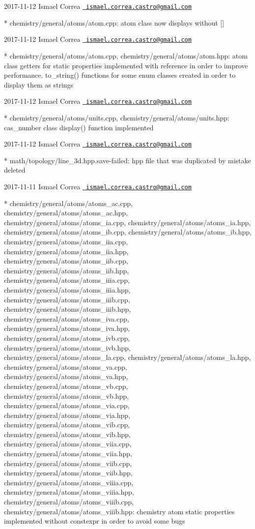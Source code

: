  2017-\/11-\/12 Ismael Correa \href{mailto:ismael.correa.castro@gmail.com}{\texttt{ ismael.\+correa.\+castro@gmail.\+com}} \begin{DoxyVerb}* chemistry/general/atoms/atom.cpp: atom class now displays without
[]
\end{DoxyVerb}
 2017-\/11-\/12 Ismael Correa \href{mailto:ismael.correa.castro@gmail.com}{\texttt{ ismael.\+correa.\+castro@gmail.\+com}} \begin{DoxyVerb}* chemistry/general/atoms/atom.cpp,
chemistry/general/atoms/atom.hpp: atom class getters for static
properties implemented with reference in order to improve
performance. to_string() functions for some enum classes created in
order to display them as strings
\end{DoxyVerb}
 2017-\/11-\/12 Ismael Correa \href{mailto:ismael.correa.castro@gmail.com}{\texttt{ ismael.\+correa.\+castro@gmail.\+com}} \begin{DoxyVerb}* chemistry/general/atoms/units.cpp,
chemistry/general/atoms/units.hpp: cas_number class display()
function implemented
\end{DoxyVerb}
 2017-\/11-\/12 Ismael Correa \href{mailto:ismael.correa.castro@gmail.com}{\texttt{ ismael.\+correa.\+castro@gmail.\+com}} \begin{DoxyVerb}* math/topology/line_3d.hpp.save-failed: hpp file that was
duplicated by mistake deleted
\end{DoxyVerb}
 2017-\/11-\/11 Ismael Correa \href{mailto:ismael.correa.castro@gmail.com}{\texttt{ ismael.\+correa.\+castro@gmail.\+com}} \begin{DoxyVerb}* chemistry/general/atoms/atoms_ac.cpp,
chemistry/general/atoms/atoms_ac.hpp,
chemistry/general/atoms/atoms_ia.cpp,
chemistry/general/atoms/atoms_ia.hpp,
chemistry/general/atoms/atoms_ib.cpp,
chemistry/general/atoms/atoms_ib.hpp,
chemistry/general/atoms/atoms_iia.cpp,
chemistry/general/atoms/atoms_iia.hpp,
chemistry/general/atoms/atoms_iib.cpp,
chemistry/general/atoms/atoms_iib.hpp,
chemistry/general/atoms/atoms_iiia.cpp,
chemistry/general/atoms/atoms_iiia.hpp,
chemistry/general/atoms/atoms_iiib.cpp,
chemistry/general/atoms/atoms_iiib.hpp,
chemistry/general/atoms/atoms_iva.cpp,
chemistry/general/atoms/atoms_iva.hpp,
chemistry/general/atoms/atoms_ivb.cpp,
chemistry/general/atoms/atoms_ivb.hpp,
chemistry/general/atoms/atoms_la.cpp,
chemistry/general/atoms/atoms_la.hpp,
chemistry/general/atoms/atoms_va.cpp,
chemistry/general/atoms/atoms_va.hpp,
chemistry/general/atoms/atoms_vb.cpp,
chemistry/general/atoms/atoms_vb.hpp,
chemistry/general/atoms/atoms_via.cpp,
chemistry/general/atoms/atoms_via.hpp,
chemistry/general/atoms/atoms_vib.cpp,
chemistry/general/atoms/atoms_vib.hpp,
chemistry/general/atoms/atoms_viia.cpp,
chemistry/general/atoms/atoms_viia.hpp,
chemistry/general/atoms/atoms_viib.cpp,
chemistry/general/atoms/atoms_viib.hpp,
chemistry/general/atoms/atoms_viiia.cpp,
chemistry/general/atoms/atoms_viiia.hpp,
chemistry/general/atoms/atoms_viiib.cpp,
chemistry/general/atoms/atoms_viiib.hpp: chemistry atom static
properties implemented without constexpr in order to avoid some bugs
\end{DoxyVerb}
